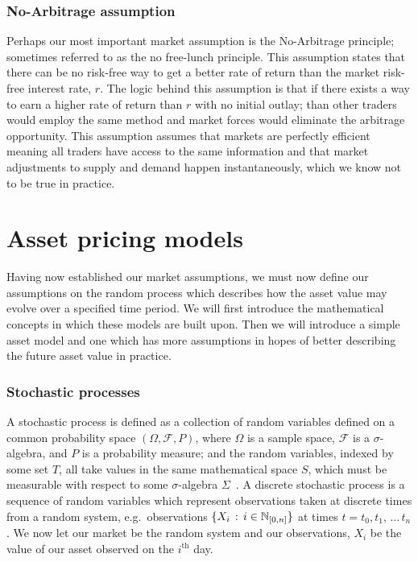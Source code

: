\subsubsection{No-Arbitrage assumption}

Perhaps our most important market assumption is the No-Arbitrage principle; sometimes referred to as the no free-lunch principle. This assumption states that there can be no risk-free way to get a better rate of return than the market risk-free interest rate, \(r\). The logic behind this assumption is that if there exists a way to earn a higher rate of return than \(r\) with no initial outlay; than other traders would employ the same method and market forces would eliminate the arbitrage opportunity. This assumption assumes that markets are perfectly efficient meaning all traders have access to the same information and that market adjustments to supply and demand happen instantaneously, which we know not to be true in practice.

\section{Asset pricing models}

Having now established our market assumptions, we must now define our assumptions on the random process which describes how the asset value may evolve over a specified time period. We will first introduce the mathematical concepts in which these models are built upon. Then we will introduce a simple asset model and one which has more assumptions in hopes of better describing the future asset value in practice.

\subsubsection{Stochastic processes}

A stochastic process is defined as a collection of random variables defined on a common probability space \( (\Omega ,\mathcal{F},P) \), where \( \Omega \)  is a sample space, \( \mathcal{F} \) is a \( \sigma \)-algebra, and \( P \) is a probability measure; and the random variables, indexed by some set \( T \), all take values in the same mathematical space \(S\), which must be measurable with respect to some \( \sigma \)-algebra \( \Sigma \)~\cite{lamperti1977stochastic}.
\nline{}
A discrete stochastic process is a sequence of random variables which represent observations taken at discrete times from a random system, e.g.\ observations \( \{X_i\,:\, i \in \mathbb{N}_{[0,n]}\} \) at times \( t = t_0,t_1,\,\dots \,t_n \). We now let our market be the random system and our observations, \( X_i \) be the value of our asset observed on the \( i^\text{th}\) day. 

